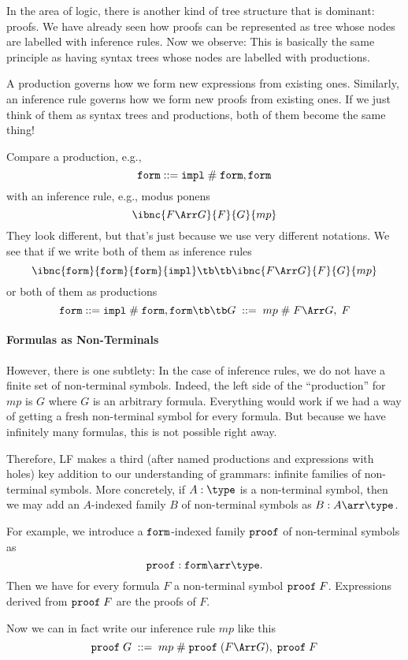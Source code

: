 In the area of logic, there is another kind of tree structure that is dominant: proofs. We have already seen how proofs can be represented as tree whose nodes are labelled with inference rules. Now we observe: This is basically the same principle as having syntax trees whose nodes are labelled with productions.

A production governs how we form new expressions from existing ones. Similarly, an inference rule governs how we form new proofs from existing ones. If we just think of them as syntax trees and productions, both of them become the same thing!

{\renewcommand{\der}{}
Compare a production, e.g., 
\[\mathtt{form}::=\mathtt{impl} \;\#\; \mathtt{form},\mathtt{form}\]
with an inference rule, e.g., modus ponens
\[\ibnc{\der F\impl G}{\der F}{\der G}{mp}\]
They look different, but that's just because we use very different notations. We see that if we write both of them as inference rules
\[
\ibnc{\FORM}{\FORM}{\FORM}{\rlname{impl}}
\tb\tb
\ibnc{\der F\impl G}{\der F}{\der G}{mp}
\]
or both of them as productions
\[
\FORM::=\rlname{impl} \rnsep \FORM,\FORM
\tb\tb
\der G \;::=\; mp \rnsep \der F\impl G, \;\der F
\]

\paragraph{Formulas as Non-Terminals}
However, there is one subtlety: In the case of inference rules, we do not have a finite set of non-terminal symbols. Indeed, the left side of the ``production'' for $mp$ is $\der G$ where $G$ is an arbitrary formula. Everything would work if we had a way of getting a fresh non-terminal symbol for every formula. But because we have infinitely many formulas, this is not possible right away.

Therefore, LF makes a third (after named productions and expressions with holes) key addition to our understanding of grammars: infinite families of non-terminal symbols. More concretely, if $A:\type$ is a non-terminal symbol, then we may add an $A$-indexed family $B$ of non-terminal symbols as $B:A\arr\type$.
}

For example, we introduce a $\mathtt{form}$-indexed family $\mathtt{proof}$ of non-terminal symbols as \[\PROOF:\FORM\arr\type.\] Then we have for every formula $F$ a non-terminal symbol $\mathtt{proof}\; F$. Expressions derived from $\mathtt{proof}\; F$ are the proofs of $F$.

Now we can in fact write our inference rule $mp$ like this
\[
\PROOF\; G \;::=\; mp \rnsep \PROOF\;(F\impl G), \;\PROOF\; F
\]

